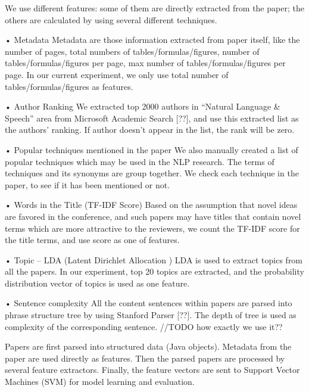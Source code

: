 \documentclass[11pt,letterpaper]{article}
\begin{document}
We use different features: some of them are directly extracted from the paper; the others are calculated by using several different techniques. 

•	Metadata
Metadata are those information extracted from paper itself, like the number of pages, total numbers of tables/formulas/figures, number of tables/formulas/figures per page, max number of tables/formulas/figures per page. In our current experiment, we only use total number of tables/formulas/figures as features.

•	Author Ranking
We extracted top 2000 authors in “Natural Language \& Speech” area from Microsoft Academic Search [??], and use this extracted list as the authors’ ranking. If author doesn’t appear in the list, the rank will be zero.

•	Popular techniques mentioned in the paper
We also manually created a list of popular techniques which may be used in the NLP research. The terms of techniques and its synonyms are group together. We check each technique in the paper, to see if it has been mentioned or not.

•	Words in the Title (TF-IDF Score)
Based on the assumption that novel ideas are favored in the conference, and such papers may have titles that contain novel terms which are more attractive to the reviewers, we count the TF-IDF score for the title terms, and use score as one of features.

•	Topic – LDA (Latent Dirichlet Allocation )
LDA is used to extract topics from all the papers. In our experiment, top 20 topics are extracted, and the probability distribution vector of topics is used as one feature. 

•	Sentence complexity
All the content sentences within papers are parsed into phrase structure tree by using Stanford Parser [??]. The depth of tree is used as complexity of the corresponding sentence.  //TODO how exactly we use it??


Papers are first parsed into structured data (Java objects). Metadata from the paper are used directly as features. Then the parsed papers are processed by several feature extractors. Finally, the feature vectors are sent to Support Vector Machines (SVM) for model learning and evaluation.
\end{document}
